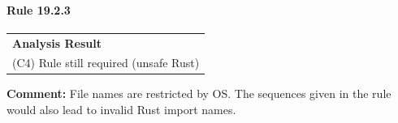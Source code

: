 \paragraph{Rule 19.2.3}
\begin{longtable}{p{13cm}}
\textbf{Analysis Result} \\
(C4) Rule still required (unsafe Rust) \\
\end{longtable}
\textbf{Comment:} File names are restricted by OS. The sequences given in the rule would also lead to invalid Rust import names. \\
